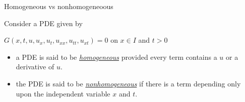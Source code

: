 \documentclass[t,10pt,fleqn]{beamer}
\newcommand{\tu}[1]{\underline{\textit{#1}}}
\begin{document}
\begin{frame}

\begin{block}{Homogeneous vs nonhomogeneoous}

Consider a PDE given by 
      \begin{center}
            $G(x,t,u,u_x, u_t,u_{xx}, u_{tt}, u_{xt})=0$ on $x \in I$ and $t>0$
      \end{center}

\begin{itemize}
    \pause
      \item  a PDE is said to be \tu{homogeneous} provided every term contains a $u$ or a derivative of $u$.
               \pause
   \item  the PDE is said to be \tu{nonhomogeneous} if there is a term depending only upon the independent variable $x$ and $t$.    
\end{itemize}

\end{block}
  

 \end{frame}
\end{document}
